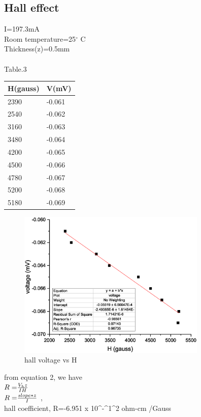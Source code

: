 \subsection{Hall effect}
I=197.3mA\\
Room temperature=25$^{\circ}$ C\\
Thickness(z)=0.5mm\\
\\Table.3
\begin{table}[!ht]
    \centering
    \begin{tabular}{|l|l|}
    \hline
        H(gauss) & V(mV) \\ \hline
        2390 & -0.061 \\ \hline
        2540 & -0.062 \\ \hline
        3160 & -0.063 \\ \hline
        3480 & -0.064 \\ \hline
        4200 & -0.065 \\ \hline
        4500 & -0.066 \\ \hline
        4780 & -0.067 \\ \hline
        5200 & -0.068 \\ \hline
        5180 & -0.069 \\ \hline
    \end{tabular}
\end{table}
\begin{figure}[h!]
\centering
\includegraphics[width=90mm]{images/Graph6.eps}%
\caption{\label{fig:epsart} hall voltage vs H}
\end{figure}

from equation 2, we have\\
\(R=$$\frac{V_h z}{IH}$$\)\\
 \(R=$$\frac{slope *z}{I}$$\) ,\\hall coefficient, 
R=-6.951 x 10^-^1^2 ohm-cm /Gauss
 
